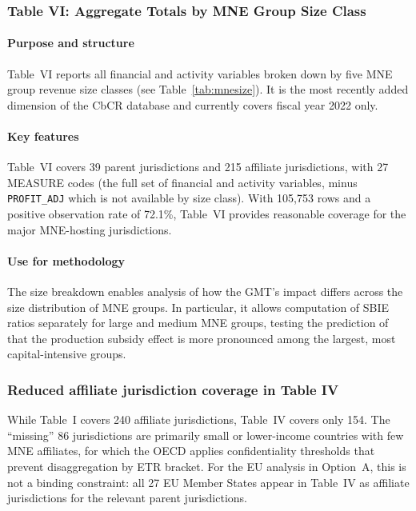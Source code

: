 \documentclass[11pt,a4paper]{article}
\newcommand{\code}[1]{\texttt{#1}}
\begin{document}
\subsubsection{Table VI: Aggregate Totals by MNE Group Size Class}\label{sec:table6}

\paragraph{Purpose and structure}
Table~VI reports all financial and activity variables broken down by five MNE group revenue size classes (see Table~\ref{tab:mnesize}). It is the most recently added dimension of the CbCR database and currently covers fiscal year 2022 only.

\paragraph{Key features}
Table~VI covers 39 parent jurisdictions and 215 affiliate jurisdictions, with 27 MEASURE codes (the full set of financial and activity variables, minus \code{PROFIT\_ADJ} which is not available by size class). With 105,753 rows and a positive observation rate of 72.1\%, Table~VI provides reasonable coverage for the major MNE-hosting jurisdictions.

\paragraph{Use for methodology}
The size breakdown enables analysis of how the GMT's impact differs across the size distribution of MNE groups. In particular, it allows computation of SBIE ratios separately for large and medium MNE groups, testing the prediction of \citet{schjelderup2024} that the production subsidy effect is more pronounced among the largest, most capital-intensive groups.

\subsubsection{Reduced affiliate jurisdiction coverage in Table IV}

While Table~I covers 240 affiliate jurisdictions, Table~IV covers only 154. The
``missing'' 86 jurisdictions are primarily small or lower-income countries with
few MNE affiliates, for which the OECD applies confidentiality thresholds that
prevent disaggregation by ETR bracket. For the EU analysis in Option~A, this is
not a binding constraint: all 27 EU Member States appear in Table~IV as affiliate
jurisdictions for the relevant parent jurisdictions.
\end{document}
